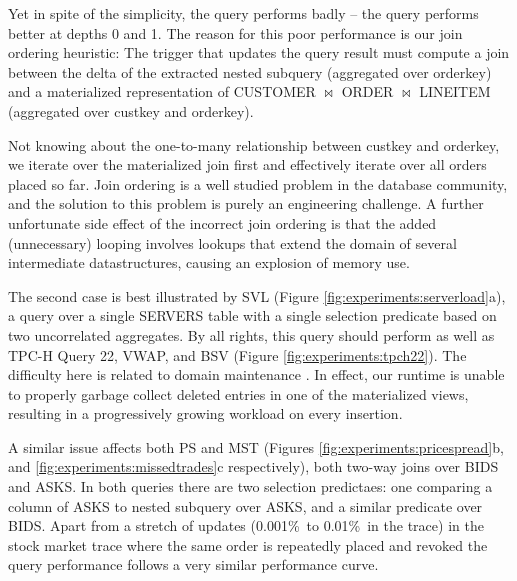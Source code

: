 Yet in spite of the simplicity, the query performs badly -- the query performs better at depths 0 and 1.  The reason for this poor performance is our join ordering heuristic: The trigger that updates the query result must compute a join between the delta of the extracted nested subquery (aggregated over orderkey) and a materialized representation of CUSTOMER $\bowtie$ ORDER $\bowtie$ LINEITEM (aggregated over custkey and orderkey).  

Not knowing about the one-to-many relationship between custkey and orderkey, we iterate over the materialized join first and effectively iterate over all orders placed so far.  Join ordering is a well studied problem in the database community, and the solution to this problem is purely an engineering challenge.  A further unfortunate side effect of the incorrect join ordering is that the added (unnecessary) looping involves lookups that extend the domain of several intermediate datastructures, causing an explosion of memory use.

The second case is best illustrated by SVL (Figure \ref{fig:experiments:serverload}a), a query over a single SERVERS table with a single selection predicate based on two uncorrelated aggregates.  By all rights, this query should perform as well as TPC-H Query 22, VWAP, and BSV (Figure \ref{fig:experiments:tpch22}).  The difficulty here is related to domain maintenance .  In effect, our runtime is unable to properly garbage collect deleted entries in one of the materialized views, resulting in a progressively growing workload on every insertion.  

A similar issue affects both PS and MST (Figures \ref{fig:experiments:pricespread}b, and \ref{fig:experiments:missedtrades}c respectively), both two-way joins over BIDS and ASKS.  In both queries there are two selection predictaes: one comparing a column of ASKS to nested subquery over ASKS, and a similar predicate over BIDS.  Apart from a stretch of updates (0.001\%\ to 0.01\%\ in the trace) in the stock market trace where the same order is repeatedly placed and revoked the query performance follows a very similar performance curve. 

